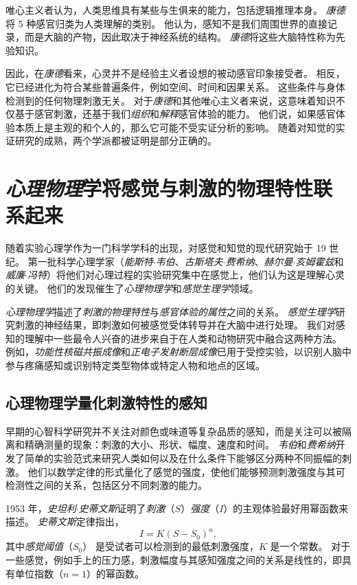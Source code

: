 唯心主义者认为，人类思维具有某些与生俱来的能力，包括逻辑推理本身。
\textit{康德}将 5 种感官归类为人类理解的类别。
他认为，感知不是我们周围世界的直接记录，而是大脑的产物，因此取决于神经系统的结构。
\textit{康德}将这些大脑特性称为先验知识。


因此，在\textit{康德}看来，心灵并不是经验主义者设想的被动感官印象接受者。
相反，它已经进化为符合某些普遍条件，例如空间、时间和因果关系。
这些条件与身体检测到的任何物理刺激无关。 
对于\textit{康德}和其他唯心主义者来说，这意味着知识不仅基于感官刺激，还基于我们\textit{组织}和\textit{解释}感官体验的能力。
他们说，如果感官体验本质上是主观的和个人的，那么它可能不受实证分析的影响。
随着对知觉的实证研究的成熟，两个学派都被证明是部分正确的。



\section{\textit{心理物理}学将感觉与刺激的物理特性联系起来}

随着实验心理学作为一门科学学科的出现，对感觉和知觉的现代研究始于 19 世纪。
第一批科学心理学家（\textit{能斯特$\cdot$韦伯}、\textit{古斯塔夫$\cdot$费希纳}、\textit{赫尔曼$\cdot$亥姆霍兹}和\textit{威廉$\cdot$冯特}）将他们对心理过程的实验研究集中在感觉上，他们认为这是理解心灵的关键。
他们的发现催生了\textit{心理物理学}和\textit{感觉生理学}领域。


\textit{心理物理学}描述了\textit{刺激的物理特性}与\textit{感官体验的属性}之间的关系。 
\textit{感觉生理学}研究刺激的神经结果，即刺激如何被感觉受体转导并在大脑中进行处理。
我们对感知的理解中一些最令人兴奋的进步来自于在人类和动物研究中融合这两种方法。
例如，\textit{功能性核磁共振成像}和\textit{正电子发射断层成像}已用于受控实验，以识别人脑中参与疼痛感知或识别特定类型物体或特定人物和地点的区域。


\subsection{心理物理学量化刺激特性的感知}

早期的心智科学研究并不关注对颜色或味道等复杂品质的感知，而是关注可以被隔离和精确测量的现象：刺激的大小、形状、幅度、速度和时间。
\textit{韦伯}和\textit{费希纳}开发了简单的实验范式来研究人类如何以及在什么条件下能够区分两种不同振幅的刺激。
他们以数学定律的形式量化了感觉的强度，使他们能够预测刺激强度与其可检测性之间的关系，包括区分不同刺激的能力。


1953 年，\textit{史坦利$\cdot$史蒂文斯}证明了\textit{刺激}（$ S $）\textit{强度}（$ I $）的主观体验最好用幂函数来描述。 
\textit{史蒂文斯}定律指出，
\begin{equation}
	I = K(S-S_0)^n,
\end{equation}
其中\textit{感觉阈值}（$ S_0 $） 是受试者可以检测到的最低刺激强度，$K$ 是一个常数。 
对于一些感觉，例如手上的压力感，刺激幅度与其感知强度之间的关系是线性的，即具有单位指数（$ n = 1 $）的幂函数。


